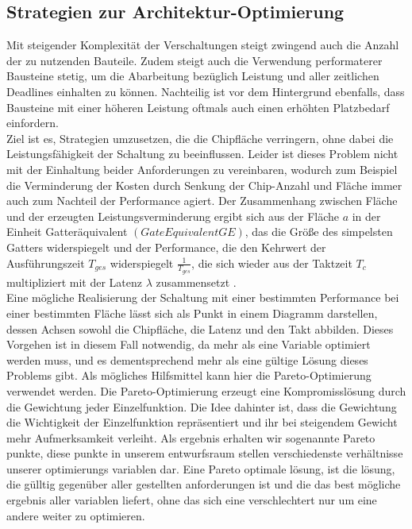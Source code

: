 \documentclass[conference]{IEEEtran}
\begin{document}
\subsection{Strategien zur Architektur-Optimierung}
Mit steigender Komplexität der Verschaltungen steigt zwingend auch die Anzahl der  zu nutzenden Bauteile. Zudem steigt auch die Verwendung performaterer Bausteine stetig, um die Abarbeitung bezüglich Leistung und aller zeitlichen Deadlines einhalten zu können. Nachteilig ist vor dem Hintergrund ebenfalls, dass Bausteine mit einer höheren Leistung oftmals auch einen erhöhten Platzbedarf einfordern\cite[S.327]{2}.\\
Ziel ist es, Strategien umzusetzen, die die Chipfläche verringern, ohne dabei die Leistungsfähigkeit der Schaltung zu beeinflussen. Leider ist dieses Problem nicht mit der Einhaltung beider Anforderungen zu vereinbaren, wodurch zum Beispiel die Verminderung der Kosten durch Senkung der Chip-Anzahl und Fläche immer auch zum Nachteil der Performance agiert. Der Zusammenhang zwischen Fläche und der erzeugten Leistungsverminderung ergibt sich aus der Fläche $a$ in der Einheit Gatteräquivalent $(Gate Equivalent GE)$, das die Größe des simpelsten Gatters widerspiegelt\cite[S.326]{2} und der Performance, die den Kehrwert der Ausführungszeit $T_{ges}$ widerspiegelt $\frac{1}{T_{ges}}$, die sich wieder aus der Taktzeit $T_c$ multipliziert mit der Latenz $\lambda$ zusammensetzt
\cite[S.325-326]{2}.\\
 Eine mögliche Realisierung der Schaltung mit einer bestimmten Performance bei einer bestimmten Fläche lässt sich als Punkt in einem Diagramm darstellen, dessen Achsen sowohl die Chipfläche, die Latenz und den Takt abbilden\cite[S.326]{2}.
 Dieses Vorgehen\cite{?} ist in diesem Fall notwendig, da mehr als eine Variable optimiert werden muss, und es dementsprechend mehr als eine gültige Lösung dieses Problems gibt. Als mögliches Hilfsmittel kann hier die Pareto-Optimierung verwendet werden. Die Pareto-Optimierung erzeugt eine Kompromisslösung durch die Gewichtung jeder Einzelfunktion. Die Idee dahinter ist, dass die Gewichtung die Wichtigkeit der Einzelfunktion repräsentiert und ihr bei steigendem Gewicht mehr Aufmerksamkeit verleiht\cite[S.45]{4}. Als ergebnis erhalten wir sogenannte Pareto punkte, diese punkte in unserem entwurfsraum stellen verschiedenste verhältnisse unserer optimierungs variablen dar. Eine Pareto optimale lösung, ist die lösung, die gülltig gegenüber aller gestellten anforderungen ist und die das best mögliche ergebnis aller variablen liefert, ohne das sich eine verschlechtert nur um eine andere weiter zu optimieren.
\end{document}
